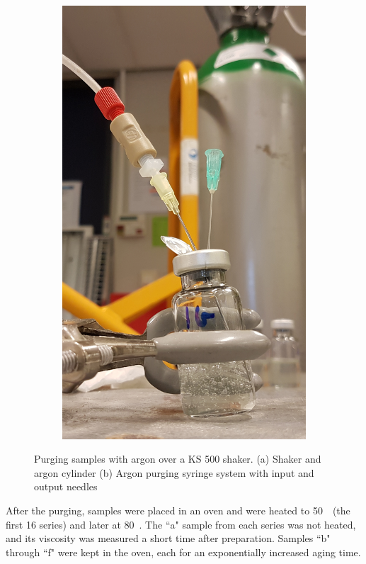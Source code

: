 \begin{figure}[p]
\begin{subfigure}{0.45\textwidth}
        \includegraphics[width=\linewidth]{img/fig/argonPurge.jpg}
        \caption{} \label{fig:argonPurge}
    \end{subfigure}
    \caption{Purging samples with argon over a KS 500 shaker. (a) Shaker and argon cylinder (b) Argon purging syringe system with input and output needles}
    \label{fig:shaking}
\end{figure}

After the purging, samples were placed in an oven and were heated to 50~\celsius~(the first 16 series) and later at 80~\celsius. The ``a" sample from each series was not heated, and its viscosity was measured a short time after preparation. Samples ``b" through ``f" were kept in the oven, each for an exponentially increased aging time. 

